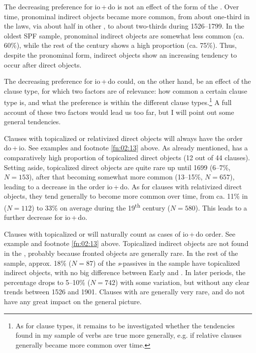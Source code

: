 \documentclass[output=paper]{langscibook}
\begin{document}
The decreasing preference for io\,+\,do is not an effect of the form of the . Over time, pronominal indirect objects became more common, from about one-third in the laws, via about half in other , to about two-thirds during 1526–1799. In the oldest SPF sample, pronominal indirect objects are somewhat less common (ca. 60\%), while the rest of the century shows a high proportion (ca. 75\%). Thus, despite the pronominal form, indirect objects show an increasing tendency to occur after direct objects.



The decreasing preference for io\,+\,do could, on the other hand, be an effect of the clause type, for which two factors are of relevance: how common a certain clause type is, and what the preference is within the different clause types.\footnote{As for clause types, it remains to be investigated whether the tendencies found in my sample of   verbs are true more generally, e.g. if relative clauses generally became more common over time.}  A full account of these two factors would lead us too far, but I will point out some general tendencies.



Clauses with topicalized or relativized direct objects will always have the order do\,+\,io. See examples  and footnote \ref{fn:02:13} above. As already mentioned,  has a comparatively high proportion of topicalized direct objects (12 out of 44 clauses). Setting  aside, topicalized direct objects are quite rare up until 1699 (6–7\%, $N = 153$), after that becoming somewhat more common (13–15\%, $N = 657$), leading to a decrease in the order io\,+\,do. As for clauses with relativized direct objects, they tend generally to become more common over time, from ca. 11\% in  ($N = 112$) to 33\% on average during the 19\textsuperscript{th} century ($N = 580$). This leads to a further decrease for io\,+\,do.


 Clauses with topicalized or  will naturally count as cases of io\,+\,do order. See example  and footnote \ref{fn:02:13} above. Topicalized indirect objects are not found in the , probably because fronted objects are generally rare. In the rest of the  sample, approx. 18\% ($N = 87$) of the \textit{s}{}-passives in the sample have topicalized indirect objects, with no big difference between Early and . In later periods, the percentage drops to 5–10\% ($N = 742$) with some variation, but without any clear trends between 1526 and 1901. Clauses with  are generally very rare, and do not have any great impact on the general picture.
\end{document}
